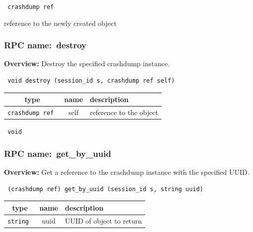 \vspace{0.3cm}

{\tt 
crashdump ref
}


reference to the newly created object
\vspace{0.3cm}
\vspace{0.3cm}
\vspace{0.3cm}
\subsubsection{RPC name:~destroy}

{\bf Overview:} 
Destroy the specified crashdump instance.

\begin{verbatim} void destroy (session_id s, crashdump ref self)\end{verbatim}



 
\vspace{0.3cm}
\begin{tabular}{|c|c|p{7cm}|}
 \hline
{\bf type} & {\bf name} & {\bf description} \\ \hline
{\tt crashdump ref } & self & reference to the object \\ \hline 

\end{tabular}

\vspace{0.3cm}

{\tt 
void
}



\vspace{0.3cm}
\vspace{0.3cm}
\vspace{0.3cm}
\subsubsection{RPC name:~get\_by\_uuid}

{\bf Overview:} 
Get a reference to the crashdump instance with the specified UUID.

\begin{verbatim} (crashdump ref) get_by_uuid (session_id s, string uuid)\end{verbatim}



 
\vspace{0.3cm}
\begin{tabular}{|c|c|p{7cm}|}
 \hline
{\bf type} & {\bf name} & {\bf description} \\ \hline
{\tt string } & uuid & UUID of object to return \\ \hline 

\end{tabular}

